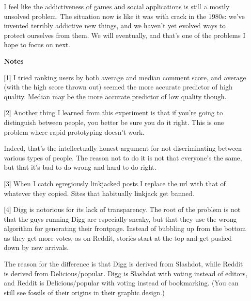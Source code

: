 I
                  feel like the addictiveness of games and social applications
                  is still a mostly unsolved problem. The situation now is like
                  it was with crack in the 1980s: we've invented terribly
                  addictive new things, and we haven't yet evolved ways to
                  protect ourselves from them. We will eventually, and that's
                  one of the problems I hope to focus on next.






                  \textbf{Notes}

[1] I tried ranking users by both average and median comment
                  score, and average (with the high score thrown out) seemed the
                  more accurate predictor of high quality. Median may be the
                  more accurate predictor of low quality though.

[2] Another thing I learned from this experiment is that if
                  you're going to distinguish between people, you better be sure
                  you do it right. This is one problem where rapid prototyping
                  doesn't work.

Indeed, that's the intellectually
                  honest argument for not discriminating between various types
                  of people. The reason not to do it is not that everyone's the
                  same, but that it's bad to do wrong and hard to do right.

[3] When I catch egregiously linkjacked posts I replace the url
                  with that of whatever they copied. Sites that habitually
                  linkjack get banned.

[4] Digg is notorious for its lack of transparency. The root of
                  the problem is not that the guys running Digg are especially
                  sneaky, but that they use the wrong algorithm for generating
                  their frontpage. Instead of bubbling up from the bottom as
                  they get more votes, as on Reddit, stories start at the top
                  and get pushed down by new arrivals.

The reason for
                  the difference is that Digg is derived from Slashdot, while
                  Reddit is derived from Delicious/popular. Digg is Slashdot
                  with voting instead of editors, and Reddit is
                  Delicious/popular with voting instead of bookmarking. (You can
                  still see fossils of their origins in their graphic
                  design.)

